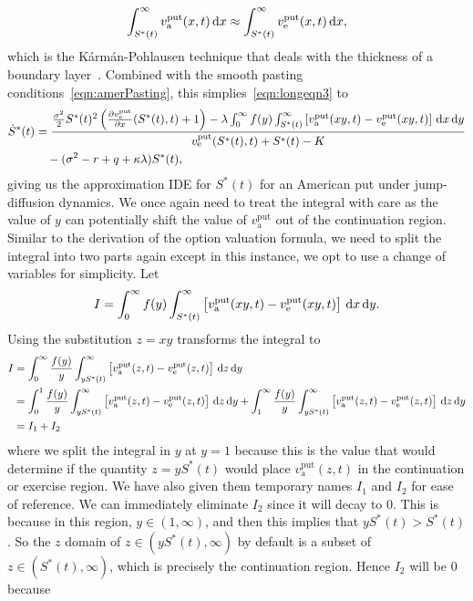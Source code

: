 			\begin{equation}
				\label{eqn:assump}
				\int_{S^*(t)}^\infty v_{\text{a}}^{\text{put}}(x,t) \, \mathrm d x \approx \int_{S^*(t)}^\infty  v_{\text{e}}^{\text{put}}(x,t) \, \mathrm d x,
			\end{equation}
		 which is the K\'arm\'an-Pohlausen technique that deals with the thickness of a boundary layer~\cite[pp. 421--423]{Zwillinger1998}. Combined with the smooth pasting conditions~\eqref{eqn:amerPasting}, this simplies~\eqref{eqn:longeqn3} to
			\begin{equation}
				\label{eqn:longeqn4}
				\begin{split}
				\dot{S}^*(t) &= \frac{\frac{\sigma^2}{2}S^*(t)^2\left( \frac{\partial  v_{\text{e}}^{\text{put}} }{\partial x}(S^*(t),t) + 1\right) - \lambda\int_0^\infty f(y) \int_{S^*(t)}^\infty \left[ v_{\text{a}}^{\text{put}}(xy,t) -  v_{\text{e}}^{\text{put}}(xy,t) \right] \, \mathrm d x \, \mathrm d y}{ v_{\text{e}}^{\text{put}}(S^*(t),t) + S^*(t) - K} \\
				&\quad{} - (\sigma^2 - r + q +\kappa\lambda)S^*(t),
				\end{split}
			\end{equation}
			giving us the approximation IDE for $S^*(t)$ for an American put under jump-diffusion dynamics. We once again need to treat the integral with care as the value of $y$ can potentially shift the value of $v_{\text{a}}^{\text{put}}$ out of the continuation region. Similar to the derivation of the option valuation formula, we need to split the integral into two parts again except in this instance, we opt to use a change of variables for simplicity. Let
				$$
					I = \int_0^\infty f(y) \int_{S^*(t)}^\infty \left[ v_{\text{a}}^{\text{put}}(xy,t) -  v_{\text{e}}^{\text{put}}(xy,t) \right] \, \mathrm d x \, \mathrm d y.
				$$ 
	Using the substitution $z = xy$ transforms the integral to
			\begin{align*}
				I &= \int_0^\infty \frac{f(y)}{y}\int_{yS^*(t)}^\infty \left[ v_{\text{a}}^{\text{put}}(z,t) -  v_{\text{e}}^{\text{put}}(z,t) \right] \, \mathrm d z\, \mathrm d y \\
				&= \int_0^1 \frac{f(y)}{y} \int_{yS^*(t)}^\infty \left[ v_{\text{a}}^{\text{put}}(z,t) -  v_{\text{e}}^{\text{put}}(z,t) \right] \, \mathrm d z\, \mathrm d y + \int_1^\infty\frac{f(y)}{y} \int_{yS^*(t)}^\infty \left[ v_{\text{a}}^{\text{put}}(z,t) -  v_{\text{e}}^{\text{put}}(z,t) \right] \, \mathrm d z\, \mathrm d y \\
				&= I_1 + I_2
			\end{align*}
	where we split the integral in $y$ at $y=1$ because this is the value that would determine if the quantity $z = yS^*(t)$ would place $v_{\text{a}}^{\text{put}}(z,t)$ in the continuation or exercise region. We have also given them temporary names $I_1$ and $I_2$ for ease of reference. We can immediately eliminate $I_2$ since it will decay to 0. This is because in this region, $y \in (1,\infty)$, and then this implies that $yS^*(t) > S^*(t)$. So the $z$ domain of $z \in (yS^*(t),\infty)$ by default is a subset of $z \in (S^*(t),\infty)$, which is precisely the continuation region. Hence $I_2$ will be 0 because 
